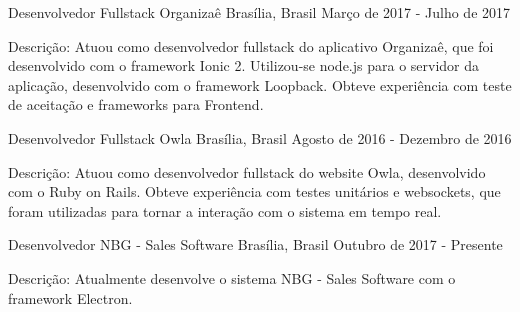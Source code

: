 \begin{cventries}
  \cventry
    {Desenvolvedor Fullstack}
    {Organizaê}
    {Brasília, Brasil}
    {Março de 2017 - Julho de 2017}
    {
      \begin{cvitems}
        \item {Descrição: Atuou como desenvolvedor fullstack do aplicativo Organizaê, que foi desenvolvido com o framework Ionic 2. Utilizou-se node.js para o servidor da aplicação, desenvolvido com o framework Loopback. Obteve experiência com teste de aceitação e frameworks para Frontend.}
      \end{cvitems}
    }
  \cventry
    {Desenvolvedor Fullstack}
    {Owla}
    {Brasília, Brasil}
    {Agosto de 2016 - Dezembro de 2016}
    {
      \begin{cvitems}
        \item {Descrição: Atuou como desenvolvedor fullstack do website Owla, desenvolvido com o Ruby on Rails. Obteve experiência com testes unitários e websockets, que foram utilizadas para tornar a interação com o sistema em tempo real.}
      \end{cvitems}
    }
  \cventry
    {Desenvolvedor}
    {NBG - Sales Software}
    {Brasília, Brasil}
    {Outubro de 2017 - Presente}
    {
      \begin{cvitems}
        \item {Descrição: Atualmente desenvolve o sistema NBG - Sales Software com o framework Electron.}
      \end{cvitems}
    }
\end{cventries}
